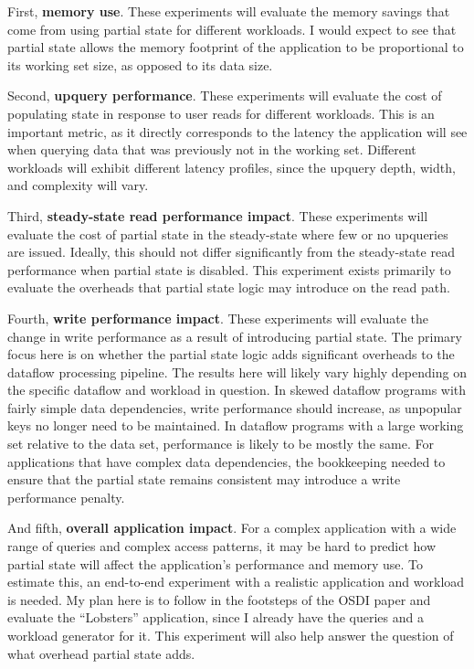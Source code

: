 \documentclass[fontsize=12pt,paper=letter]{scrartcl}
\begin{document}
First, \textbf{memory use}. These experiments will evaluate the memory
savings that come from using partial state for different workloads. I
would expect to see that partial state allows the memory footprint of
the application to be proportional to its working set size, as opposed
to its data size.

Second, \textbf{upquery performance}. These experiments will evaluate the
cost of populating state in response to user reads for different
workloads. This is an important metric, as it directly corresponds to
the latency the application will see when querying data that was
previously not in the working set. Different workloads will exhibit
different latency profiles, since the upquery depth, width, and
complexity will vary.

Third, \textbf{steady-state read performance impact}. These experiments will
evaluate the cost of partial state in the steady-state where few or no
upqueries are issued. Ideally, this should not differ significantly from
the steady-state read performance when partial state is disabled. This
experiment exists primarily to evaluate the overheads that partial state
logic may introduce on the read path.

Fourth, \textbf{write performance impact}. These experiments will evaluate
the change in write performance as a result of introducing partial
state. The primary focus here is on whether the partial state logic adds
significant overheads to the dataflow processing pipeline. The results
here will likely vary highly depending on the specific dataflow and
workload in question. In skewed dataflow programs with fairly simple
data dependencies, write performance should increase, as unpopular keys
no longer need to be maintained. In dataflow programs with a large
working set relative to the data set, performance is likely to be mostly
the same. For applications that have complex data dependencies, the
bookkeeping needed to ensure that the partial state remains consistent
may introduce a write performance penalty.

And fifth, \textbf{overall application impact}. For a complex application
with a wide range of queries and complex access patterns, it may be hard
to predict how partial state will affect the application's performance
and memory use. To estimate this, an end-to-end experiment with a
realistic application and workload is needed. My plan here is to
follow in the footsteps of the OSDI paper and evaluate the ``Lobsters''
application, since I already have the queries and a workload generator
for it. This experiment will also help answer the question of what
overhead partial state adds.
\end{document}
